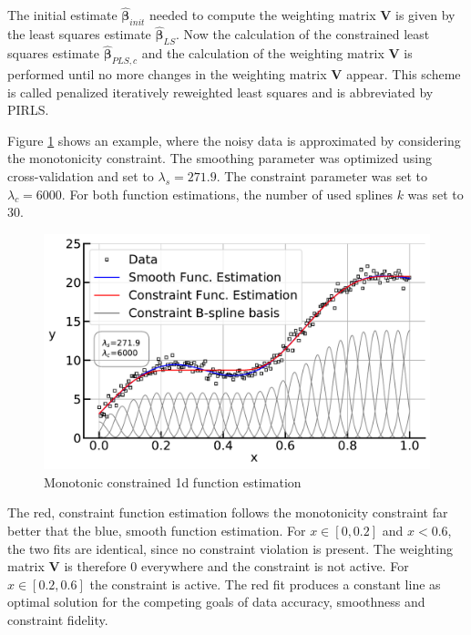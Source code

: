 \documentclass[10pt,a4paper]{article}
\begin{document}
	The initial estimate $\hat{\boldsymbol{\beta}}_{init}$ needed to compute the weighting matrix $\boldsymbol{V}$ is given by the least squares estimate $\hat{\boldsymbol{\beta}}_{LS}$. Now the calculation of the constrained least squares estimate $\hat{\boldsymbol{\beta}}_{PLS,c}$ and the calculation of the weighting matrix $\boldsymbol{V}$ is performed until no more changes in the weighting matrix $\boldsymbol{V}$ appear. This scheme is called penalized iteratively reweighted least squares and is abbreviated by PIRLS. \cite{hofner2011monotonicity}
	
	
	Figure \ref{fig:incspline} shows an example, where the noisy data is approximated by considering the monotonicity constraint. The smoothing parameter was optimized using cross-validation and set to $\lambda_s=271.9$. The constraint parameter was set to $\lambda_c = 6000$. For both function estimations, the number of used splines $k$ was set to $30$. 	
	
	\begin{figure}[H]
		\centering
		\includegraphics[width=\linewidth]{../thesisplots/inc_spline.pdf}
		\caption{Monotonic constrained 1d function estimation}
		\label{fig:incspline}
	\end{figure}	

	The red, constraint function estimation follows the monotonicity constraint far better that the blue, smooth function estimation. For $x \in [0, 0.2]$ and $x < 0.6$, the two fits are identical, since no constraint violation is present. The weighting matrix $\boldsymbol{V}$ is therefore $0$ everywhere and the constraint is not active. For $x \in [0.2, 0.6]$ the constraint is active. The red fit produces a constant line as optimal solution for the competing goals of data accuracy, smoothness and constraint fidelity.
\end{document}
